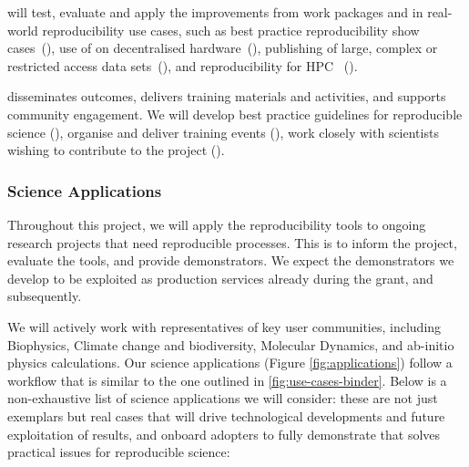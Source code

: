      will test, evaluate and apply the improvements from
    work packages  and  in real-world
    reproducibility use cases, such as best practice reproducibility show
    cases~(), use of \repotodocker{} on
    decentralised hardware~(), publishing
    of large, complex or restricted access data
    sets~(), and reproducibility for HPC~
    ().

     disseminates outcomes, delivers training materials
    and activities, and supports community engagement. We will develop best practice guidelines for reproducible
    science (), organise and deliver
    training events (), work closely with
    scientists wishing to contribute to the project ().

    \subsubsection{Science Applications}\label{sec:science-applications}
    Throughout this project, we will apply the reproducibility tools to ongoing
    research projects that need reproducible processes. This is to inform the
    project, evaluate the tools, and provide demonstrators. We expect the
    demonstrators we develop to be exploited as production services already during
    the grant, and subsequently.

We will actively work with representatives of key user communities, including Biophysics, 
Climate change and biodiversity, Molecular Dynamics, and ab-initio physics calculations.
Our science applications (Figure \ref{fig:applications}) follow a workflow that is similar to the one 
outlined in \ref{fig:use-cases-binder}. 
Below is a non-exhaustive list of science applications we will consider: these are not just exemplars but 
real cases that will drive technological developments and future exploitation of \TheProject results,
 and onboard adopters to fully demonstrate that \TheProject
solves practical issues for reproducible science:

